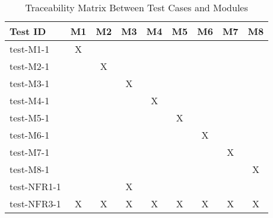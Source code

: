 \documentclass[12pt, titlepage]{article}
\begin{document}
\begin{table}[h!]\label{Table:Unit}
  \centering
  \begin{tabular}{|l|c|c|c|c|c|c|c|c|}
  \hline
  \textbf{Test ID} & \textbf{M1} & \textbf{M2} & \textbf{M3} & \textbf{M4} & \textbf{M5} & \textbf{M6} & \textbf{M7} & \textbf{M8} \\
  \hline
  test-M1-1 & X &   &   &   &   &   &   &   \\
  test-M2-1 &   & X &   &   &   &   &   &   \\
  test-M3-1 &   &   & X &   &   &   &   &   \\
  test-M4-1 &   &   &   & X &   &   &   &   \\
  test-M5-1 &   &   &   &   & X &   &   &   \\
  test-M6-1 &   &   &   &   &   & X &   &   \\
  test-M7-1 &   &   &   &   &   &  &  X &   \\
  test-M8-1 &   &   &   &   &   &   &   & X \\
  \hline
  test-NFR1-1 &   &   & X &   &   &   &   &   \\
  test-NFR3-1 & X & X & X & X & X & X & X & X \\
  \hline
  \end{tabular}
  \caption{Traceability Matrix Between Test Cases and Modules}
  \end{table}
\end{document}

